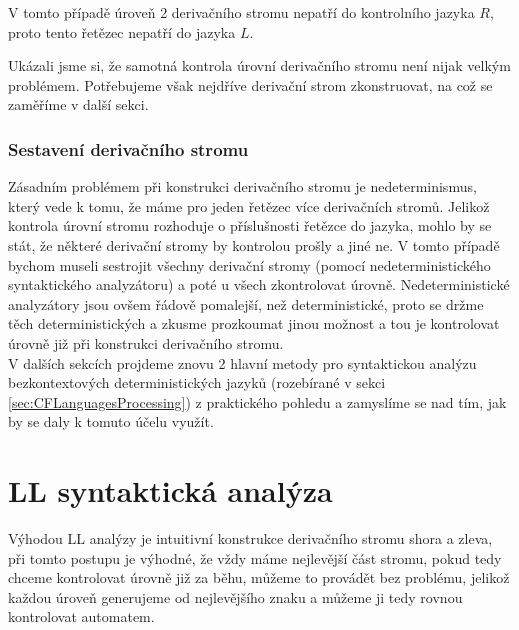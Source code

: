 \begin{exmp}
  \noindent
  V tomto případě úroveň 2 derivačního stromu nepatří do kontrolního jazyka $R$,
  proto tento řetězec nepatří do jazyka $L$.
\end{exmp}

Ukázali jsme si, že samotná kontrola úrovní derivačního stromu není nijak
velkým problémem. Potřebujeme však nejdříve derivační strom zkonstruovat,
na což se zaměříme v další sekci.

\subsubsection*{Sestavení derivačního stromu}

Zásadním problémem při konstrukci derivačního stromu je nedeterminismus,
který vede k tomu, že máme pro jeden řetězec více derivačních stromů.
Jelikož kontrola úrovní stromu rozhoduje o příslušnosti řetězce do jazyka,
mohlo by se stát, že některé derivační stromy by kontrolou prošly a jiné ne.
V tomto případě bychom museli sestrojit všechny derivační stromy (pomocí
nedeterministického syntaktického analyzátoru) a poté
u všech zkontrolovat úrovně. Nedeterministické analyzátory jsou ovšem řádově
pomalejší, než deterministické, proto se držme těch deterministických a
zkusme prozkoumat jinou možnost a tou je kontrolovat úrovně již při konstrukci
derivačního stromu.\\

V dalších sekcích projdeme znovu 2 hlavní metody pro syntaktickou analýzu bezkontextových
deterministických jazyků (rozebírané v sekci \ref{sec:CFLanguagesProcessing})
z praktického pohledu a zamyslíme se nad tím, jak by se daly k tomuto účelu
využít.

\section{LL syntaktická analýza}

Výhodou LL analýzy je intuitivní konstrukce derivačního stromu shora a zleva,
při tomto postupu je výhodné, že vždy máme nejlevější část stromu, pokud tedy
chceme kontrolovat úrovně již za běhu, můžeme to provádět bez problému, jelikož
každou úroveň generujeme od nejlevějšího znaku a můžeme ji tedy rovnou
kontrolovat automatem.\\

